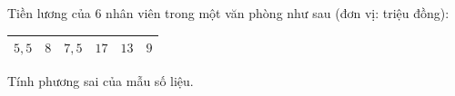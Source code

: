\begin{ex}
Tiền lương của $6$ nhân viên trong một văn phòng như sau (đơn vị: triệu đồng):
\begin{center}
\begin{tabular}{|c|c|c|c|c|c|}\hline
$5{,}5$ & $8$ & $7{,}5$ & $17$ & $13$ & $9$\\\hline
\end{tabular}
\end{center}
Tính phương sai của mẫu số liệu.
\end{ex}
